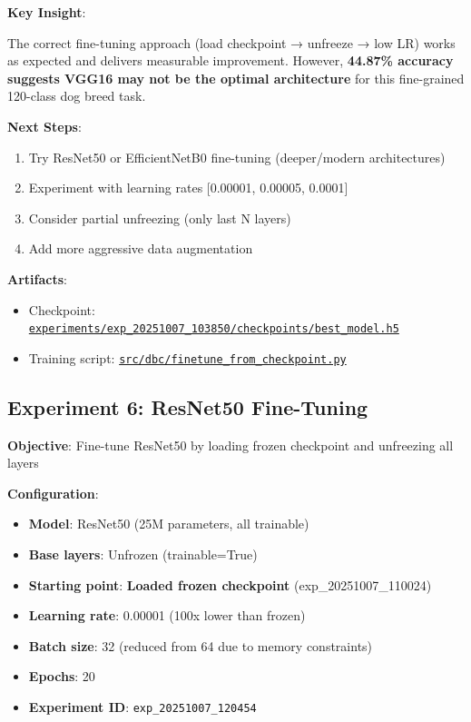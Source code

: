 \documentclass[
  letterpaper,
  DIV=11,
  numbers=noendperiod]{scrartcl}
\providecommand{\tightlist}{%
  \setlength{\itemsep}{0pt}\setlength{\parskip}{0pt}}
\begin{document}
\textbf{Key Insight}:

The correct fine-tuning approach (load checkpoint → unfreeze → low LR)
works as expected and delivers measurable improvement. However,
\textbf{44.87\% accuracy suggests VGG16 may not be the optimal
architecture} for this fine-grained 120-class dog breed task.

\textbf{Next Steps}:

\begin{enumerate}
\def\labelenumi{\arabic{enumi}.}
\tightlist
\item
  Try ResNet50 or EfficientNetB0 fine-tuning (deeper/modern
  architectures)
\item
  Experiment with learning rates {[}0.00001, 0.00005, 0.0001{]}
\item
  Consider partial unfreezing (only last N layers)
\item
  Add more aggressive data augmentation
\end{enumerate}

\textbf{Artifacts}:

\begin{itemize}
\tightlist
\item
  Checkpoint:
  \href{../experiments/exp_20251007_103850/checkpoints/best_model.h5}{\texttt{experiments/exp\_20251007\_103850/checkpoints/best\_model.h5}}
\item
  Training script:
  \href{../src/dbc/finetune_from_checkpoint.py}{\texttt{src/dbc/finetune\_from\_checkpoint.py}}
\end{itemize}

\subsection{Experiment 6: ResNet50
Fine-Tuning}\label{experiment-6-resnet50-fine-tuning}

\textbf{Objective}: Fine-tune ResNet50 by loading frozen checkpoint and
unfreezing all layers

\textbf{Configuration}:

\begin{itemize}
\tightlist
\item
  \textbf{Model}: ResNet50 (25M parameters, all trainable)
\item
  \textbf{Base layers}: Unfrozen (trainable=True)
\item
  \textbf{Starting point}: \textbf{Loaded frozen checkpoint}
  (exp\_20251007\_110024)
\item
  \textbf{Learning rate}: 0.00001 (100x lower than frozen)
\item
  \textbf{Batch size}: 32 (reduced from 64 due to memory constraints)
\item
  \textbf{Epochs}: 20
\item
  \textbf{Experiment ID}: \texttt{exp\_20251007\_120454}
\end{itemize}
\end{document}
